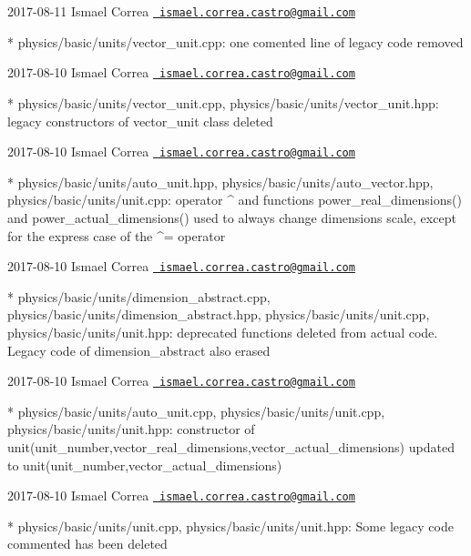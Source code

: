  2017-\/08-\/11 Ismael Correa \href{mailto:ismael.correa.castro@gmail.com}{\texttt{ ismael.\+correa.\+castro@gmail.\+com}} \begin{DoxyVerb}* physics/basic/units/vector_unit.cpp: one comented line of legacy
code removed
\end{DoxyVerb}
 2017-\/08-\/10 Ismael Correa \href{mailto:ismael.correa.castro@gmail.com}{\texttt{ ismael.\+correa.\+castro@gmail.\+com}} \begin{DoxyVerb}* physics/basic/units/vector_unit.cpp,
physics/basic/units/vector_unit.hpp: legacy constructors of
vector_unit class deleted
\end{DoxyVerb}
 2017-\/08-\/10 Ismael Correa \href{mailto:ismael.correa.castro@gmail.com}{\texttt{ ismael.\+correa.\+castro@gmail.\+com}} \begin{DoxyVerb}* physics/basic/units/auto_unit.hpp,
physics/basic/units/auto_vector.hpp, physics/basic/units/unit.cpp: 
operator ^ and functions power_real_dimensions() and
power_actual_dimensions() used to always change dimensions scale,
except for the express case of the ^= operator
\end{DoxyVerb}
 2017-\/08-\/10 Ismael Correa \href{mailto:ismael.correa.castro@gmail.com}{\texttt{ ismael.\+correa.\+castro@gmail.\+com}} \begin{DoxyVerb}* physics/basic/units/dimension_abstract.cpp,
physics/basic/units/dimension_abstract.hpp,
physics/basic/units/unit.cpp, physics/basic/units/unit.hpp: 
deprecated functions deleted from actual code. Legacy code of
dimension_abstract also erased
\end{DoxyVerb}
 2017-\/08-\/10 Ismael Correa \href{mailto:ismael.correa.castro@gmail.com}{\texttt{ ismael.\+correa.\+castro@gmail.\+com}} \begin{DoxyVerb}* physics/basic/units/auto_unit.cpp, physics/basic/units/unit.cpp,
physics/basic/units/unit.hpp: constructor of
unit(unit_number,vector_real_dimensions,vector_actual_dimensions)
updated to unit(unit_number,vector_actual_dimensions)
\end{DoxyVerb}
 2017-\/08-\/10 Ismael Correa \href{mailto:ismael.correa.castro@gmail.com}{\texttt{ ismael.\+correa.\+castro@gmail.\+com}} \begin{DoxyVerb}* physics/basic/units/unit.cpp, physics/basic/units/unit.hpp: Some
legacy code commented has been deleted
\end{DoxyVerb}
